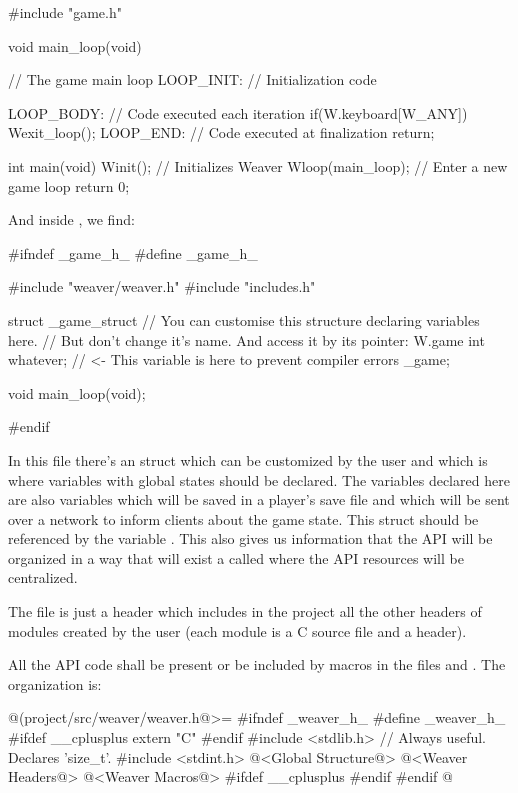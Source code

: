 \alinhaverbatim
#include "game.h"

void main_loop(void){ // The game main loop
 LOOP_INIT: // Initialization code 

 LOOP_BODY: // Code executed each iteration
    if(W.keyboard[W_ANY])
        Wexit_loop();
 LOOP_END: // Code executed at finalization
    return;
}

int main(void){
  Winit(); // Initializes Weaver
  Wloop(main_loop); // Enter a new game loop
  return 0;
}
\alinhanormal

And inside , we find:

\alinhaverbatim
#ifndef _game_h_
#define _game_h_

#include "weaver/weaver.h"
#include "includes.h"

struct _game_struct{
  // You can customise this structure declaring variables here.
  // But don't change it's name. And access it by its pointer: W.game
  int whatever; // <- This variable is here to prevent compiler errors
} _game;

void main_loop(void);

#endif
\alinhanormal

In this file there's an struct which can be customized by the user and
which is where variables with global states should be declared. The
variables declared here are also variables which will be saved in a
player's save file and which will be sent over a network to inform
clients about the game state. This struct should be referenced by the
variable . This also gives us information that the
API will be organized in a way that will exist a 
called  where the API resources will be centralized.

The file  is just a header which includes in
the project all the other headers of modules created by the user (each
module is a C source file and a header).

All the API code shall be present or be included by macros in the
files  and . The
 organization is:

\iniciocodigo
@(project/src/weaver/weaver.h@>=
#ifndef _weaver_h_
#define _weaver_h_
#ifdef __cplusplus
  extern "C" {
#endif
#include <stdlib.h> // Always useful. Declares 'size_t'.
#include <stdint.h>
@<Global Structure@>
@<Weaver Headers@>
@<Weaver Macros@>
#ifdef __cplusplus
  }
#endif
#endif
@
\fimcodigo


